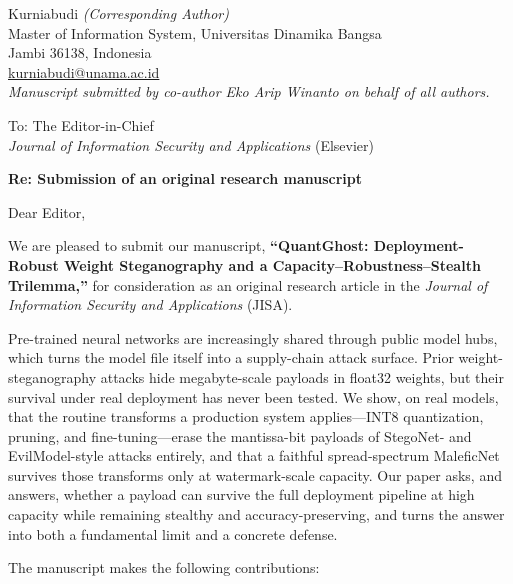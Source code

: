 \documentclass[11pt]{article}
\begin{document}
\noindent Kurniabudi \emph{(Corresponding Author)}\\
Master of Information System, Universitas Dinamika Bangsa\\
Jambi 36138, Indonesia\\
\href{mailto:kurniabudi@unama.ac.id}{kurniabudi@unama.ac.id}\\
\emph{Manuscript submitted by co-author Eko Arip Winanto on behalf of all authors.}

\vspace{1em}
\noindent To: The Editor-in-Chief\\
\noindent \emph{Journal of Information Security and Applications} (Elsevier)

\vspace{1em}
\noindent \textbf{Re: Submission of an original research manuscript}

\vspace{0.5em}
\noindent Dear Editor,

We are pleased to submit our manuscript, \textbf{``QuantGhost: Deployment-Robust Weight
Steganography and a Capacity--Robustness--Stealth Trilemma,''} for consideration as an
original research article in the \emph{Journal of Information Security and Applications}
(JISA).

Pre-trained neural networks are increasingly shared through public model hubs, which
turns the model file itself into a supply-chain attack surface. Prior weight-steganography
attacks hide megabyte-scale payloads in float32 weights, but their survival under real
deployment has never been tested. We show, on real models, that the routine transforms a
production system applies---INT8 quantization, pruning, and fine-tuning---erase the
mantissa-bit payloads of StegoNet- and EvilModel-style attacks entirely, and that a
faithful spread-spectrum MaleficNet survives those transforms only at watermark-scale
capacity. Our paper asks, and answers, whether a payload can survive the full deployment
pipeline at high capacity while remaining stealthy and accuracy-preserving, and turns the
answer into both a fundamental limit and a concrete defense.

The manuscript makes the following contributions:
\end{document}
